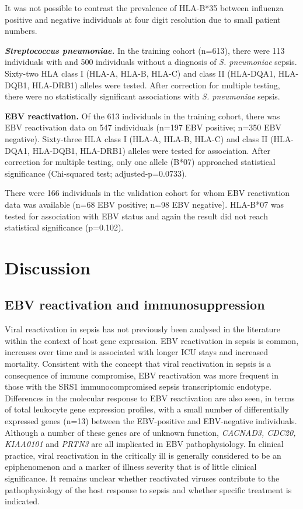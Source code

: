 It was not possible to contrast the prevalence of HLA-B*35 between influenza positive and negative individuals at four digit resolution due to small patient numbers.

\textbf{\textit{Streptococcus pneumoniae.}} In the training cohort (n=613), there were 113 individuals with and 500 individuals without a diagnosis of \textit{S. pneumoniae} sepsis. Sixty-two HLA class I (HLA-A, HLA-B, HLA-C) and class II (HLA-DQA1, HLA-DQB1, HLA-DRB1) alleles were tested. After correction for multiple testing, there were no statistically significant associations with \textit{S. pneumoniae} sepsis.

\textbf{EBV reactivation.} Of the 613 individuals in the training cohort, there was EBV reactivation data on 547 individuals (n=197 EBV positive; n=350 EBV negative). Sixty-three HLA class I (HLA-A, HLA-B, HLA-C) and class II (HLA-DQA1, HLA-DQB1, HLA-DRB1) alleles were tested for association. After correction for multiple testing, only one allele (B*07) approached statistical significance (Chi-squared test; adjusted-p=0.0733). 

There were 166 individuals in the validation cohort for whom EBV reactivation data was available (n=68 EBV positive; n=98 EBV negative). HLA-B*07 was tested for association with EBV status and again the result did not reach statistical significance (p=0.102).

\section{Discussion}
\subsection{EBV reactivation and immunosuppression}
Viral reactivation in sepsis has not previously been analysed in the literature within the context of host gene expression. EBV reactivation in sepsis is common, increases over time and is associated with longer ICU stays and increased mortality. Consistent with the concept that viral reactivation in sepsis is a consequence of immune compromise, EBV reactivation was more frequent in those with the SRS1 immunocompromised sepsis transcriptomic endotype. Differences in the molecular response to EBV reactivation are also seen, in terms of total leukocyte gene expression profiles, with a small number of differentially expressed genes (n=13) between the EBV-positive and EBV-negative individuals. Although a number of these genes are of unknown function, \textit{CACNAD3, CDC20, KIAA0101} and \textit{PRTN3} are all implicated in EBV pathophysiology. In clinical practice, viral reactivation in the critically ill is generally considered to be an epiphenomenon and a marker of illness severity that is of little clinical significance. It remains unclear whether reactivated viruses contribute to the pathophysiology of the host response to sepsis and whether specific treatment is indicated. 

